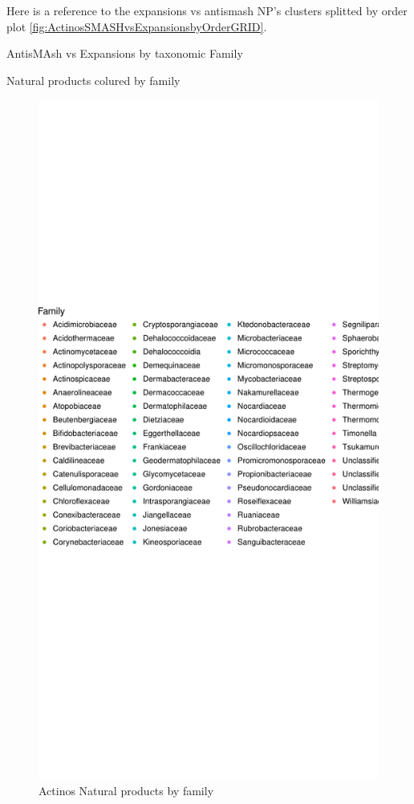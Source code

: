 \documentclass[12pt,twoside]{reedthesis}
\begin{document}
  Here is a reference to the expansions vs antismash NP's clusters
  splitted by order plot
  \autoref{fig:ActinosSMASHvsExpansionsbyOrderGRID}. \clearpage 
  
  AntisMAsh vs Expansions by taxonomic Family
  
  Natural products colured by family
  
  \begin{figure}[h!tbp]
  \centering
  \includegraphics[angle = 0,scale = 0.6]{chapter2/Actinobacteria/Actinosnpf.pdf}
  \caption[Actinos Natural products by family]{\normalsize{Actinos Natural products by family}}
  \label{fig:Actinosnpf}
  \end{figure}
  
\end{document}
